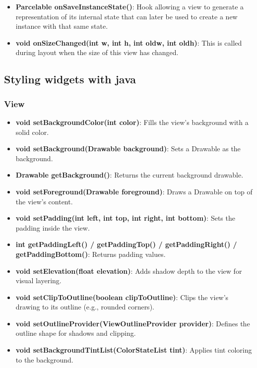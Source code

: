 \documentclass{report}
\begin{document}
\begin{itemize}
\begin{itemize}
\begin{itemize}
                \item \textbf{Parcelable	onSaveInstanceState()}: Hook allowing a view to generate a representation of its internal state that can later be used to create a new instance with that same state.
                \item \textbf{void	onSizeChanged(int w, int h, int oldw, int oldh)}: This is called during layout when the size of this view has changed.
            \end{itemize}
    \end{itemize}

    \pagebreak 
    \subsection{Styling widgets with java}
    \subsubsection{View}
    \begin{itemize}
        \item \textbf{void setBackgroundColor(int color)}: Fills the view’s background with a solid color.
        \item \textbf{void setBackground(Drawable background)}: Sets a Drawable as the background.
        \item \textbf{Drawable getBackground()}: Returns the current background drawable.
        \item \textbf{void setForeground(Drawable foreground)}: Draws a Drawable on top of the view’s content.
        \item \textbf{void setPadding(int left, int top, int right, int bottom)}: Sets the padding inside the view.
        \item \textbf{int getPaddingLeft() / getPaddingTop() / getPaddingRight() / getPaddingBottom()}: Returns padding values.
        \item \textbf{void setElevation(float elevation)}: Adds shadow depth to the view for visual layering.
        \item \textbf{void setClipToOutline(boolean clipToOutline)}: Clips the view’s drawing to its outline (e.g., rounded corners).
        \item \textbf{void setOutlineProvider(ViewOutlineProvider provider)}: Defines the outline shape for shadows and clipping.
        \item \textbf{void setBackgroundTintList(ColorStateList tint)}: Applies tint coloring to the background.

\end{itemize}
\end{itemize}
\end{document}
